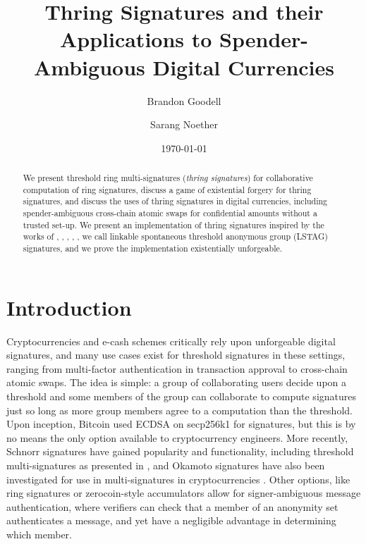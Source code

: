 \documentclass{iacrtrans}
\title{Thring Signatures and their Applications to Spender-Ambiguous Digital Currencies}
\author{Brandon Goodell \and Sarang Noether }
\institute{Monero Research Lab \email[surae@getmonero.org, sarang@getmonero.org]{{surae,sarang}@getmonero.org}}
\date{\today}
\theoremstyle{definition}
\numberwithin{theorem}{subsection}
\numberwithin{lemma}{theorem}
\begin{document}
\maketitle

\begin{abstract}
We present threshold ring multi-signatures (\textit{thring signatures}) for collaborative computation of ring signatures, discuss a game of existential forgery for thring signatures, and discuss the uses of thring signatures in digital currencies, including spender-ambiguous cross-chain atomic swaps for confidential amounts without a trusted set-up. We present an implementation of thring signatures inspired by the works of \cite{liu2004linkable}, \cite{qian2010non}, \cite{maxwell2015confidential}, \cite{backLSAG}, \cite{noether2016ring}, \cite{maxwell2018simple} we call linkable spontaneous threshold anonymous group (LSTAG) signatures, and we prove the implementation existentially unforgeable. 
\end{abstract}

\section{Introduction}


Cryptocurrencies and e-cash schemes critically rely upon unforgeable digital signatures, and many use cases exist for threshold signatures in these settings, ranging from multi-factor authentication in transaction approval to cross-chain atomic swaps. The idea is simple: a group of collaborating users decide upon a threshold and some members of the group can collaborate to compute signatures just so long as more group members agree to a computation than the threshold. Upon inception, Bitcoin used ECDSA on secp256k1 for signatures, but this is by no means the only option available to cryptocurrency engineers. More recently, Schnorr signatures \cite{schnorr1991efficient} have gained popularity and functionality, including threshold multi-signatures as presented in \cite{maxwell2018simple}, and Okamoto signatures \cite{okamoto1992provably} have also been investigated for use in multi-signatures in cryptocurrencies \cite{drijvers2018okamoto}. Other options, like ring signatures \cite{liu2004linkable} or zerocoin-style accumulators \cite{miers2013zerocoin} allow for signer-ambiguous message authentication, where verifiers can check that a member of an anonymity set authenticates a message, and yet have a negligible advantage in determining which member. 
\end{document}

